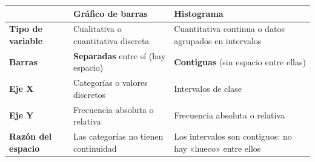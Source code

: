 \documentclass[11pt, letterpaper]{article}
\begin{document}
\begin{tcolorbox}[importantbox, title={Gráfico de barras vs. Histograma}]
\begin{center}
\renewcommand{\arraystretch}{1.35}
\begin{tabular}{p{3.2cm} p{4.2cm} p{4.2cm}}
\toprule
 & \textbf{Gráfico de barras} & \textbf{Histograma}\\
\midrule
\textbf{Tipo de variable} & Cualitativa o cuantitativa discreta & Cuantitativa continua o datos agrupados en intervalos\\
\textbf{Barras} & \textbf{Separadas} entre sí (hay espacio) & \textbf{Contiguas} (sin espacio entre ellas)\\
\textbf{Eje X} & Categorías o valores discretos & Intervalos de clase\\
\textbf{Eje Y} & Frecuencia absoluta o relativa & Frecuencia absoluta o relativa\\
\textbf{Razón del espacio} & Las categorías no tienen continuidad & Los intervalos son contiguos: no hay «hueco» entre ellos\\
\bottomrule
\end{tabular}
\end{center}
\end{tcolorbox}
\end{document}
